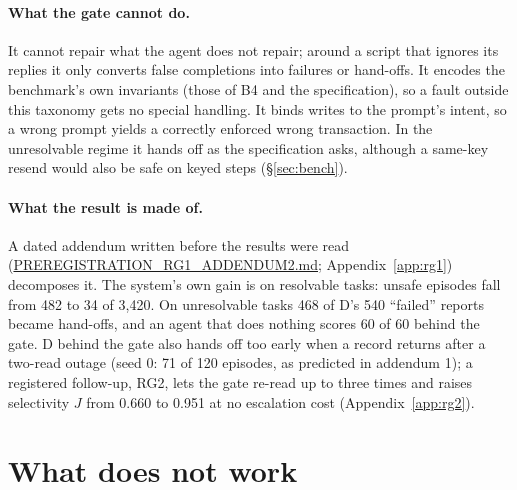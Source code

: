 \documentclass[11pt]{article}
\begin{document}
\paragraph{What the gate cannot do.} It cannot repair what the agent does not repair; around a script that ignores
its replies it only converts false completions into failures or hand-offs. It encodes the benchmark's own invariants
(those of B4 and the specification), so a fault outside this taxonomy gets no special handling. It binds writes to
the prompt's intent, so a wrong prompt yields a correctly enforced wrong transaction. In the unresolvable regime it
hands off as the specification asks, although a same-key resend would also be safe on keyed steps (\S\ref{sec:bench}).

\paragraph{What the result is made of.} A dated addendum written before the results were read
(\url{PREREGISTRATION_RG1_ADDENDUM2.md}; Appendix~\ref{app:rg1}) decomposes it. The system's own gain is on
resolvable tasks: unsafe episodes fall from 482 to 34 of 3{,}420. On unresolvable tasks 468 of D's 540 ``failed''
reports became hand-offs, and an agent that does nothing scores 60 of 60 behind the gate. D behind the gate also hands
off too early when a record returns after a two-read outage (seed 0: 71 of 120 episodes, as predicted in addendum 1);
a registered follow-up, RG2, lets the gate re-read up to three times and raises selectivity $J$ from 0.660 to 0.951 at no escalation cost (Appendix~\ref{app:rg2}).

\section{What does not work}
\label{sec:fails}
\end{document}
